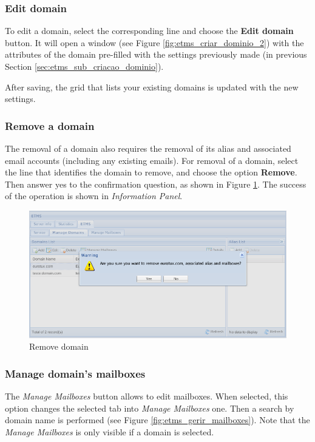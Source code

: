 \subsubsection{Edit domain}
\label{sec:etms_sub_edicao_dominio}
To edit a domain, select the corresponding line and choose the \textbf{Edit domain} button. It will open a window (see Figure \ref{fig:etms_criar_dominio_2}) with the attributes of the domain pre-filled with the settings previously made (in previous Section \ref{sec:etms_sub_criacao_dominio}).

After saving, the grid that lists your existing domains is updated with the new settings.

\subsubsection{Remove a domain}
\label{sec:etms_sub_remocao_dominio}
The removal of a domain also requires the removal of its alias and associated email accounts (including any existing emails). For removal of a domain, select the line that identifies the domain to remove, and choose the option \textbf{Remove}. Then answer yes to the confirmation question, as shown in Figure \ref{fig:etms_delete_domain}. The success of the operation is shown in \textit{Information Panel}.

\begin{figure}[H]
    \begin{center}
    \includegraphics[scale=0.45]{screenshots/etms/etms_delete_domain.png}
    \caption{Remove domain}
    \label{fig:etms_delete_domain}
    \end{center}
\end{figure}


\subsubsection{Manage domain's mailboxes}
\label{sec:etms_sub_gerir_caixas_dominio}
The \textit{Manage Mailboxes} button allows to edit mailboxes. When selected, this option changes the selected tab into \textit{Manage Mailboxes} one. Then a search by domain name is performed (see Figure \ref{fig:etms_gerir_mailboxes}). Note that the \textit{Manage Mailboxes} is only visible if a domain is selected.

